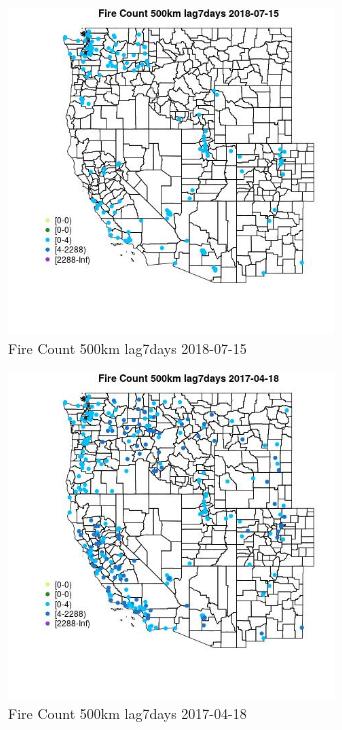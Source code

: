 \begin{figure} 
\centering  
\includegraphics[width=0.77\textwidth]{Code_Outputs/Report_ML_input_PM25_Step4_part_e_de_duplicated_aves_compiled_2019-05-20wNAs_MapObsFire_Count_500km_lag7days2018-07-15.jpg} 
\caption{\label{fig:Report_ML_input_PM25_Step4_part_e_de_duplicated_aves_compiled_2019-05-20wNAsMapObsFire_Count_500km_lag7days2018-07-15}Fire Count 500km lag7days 2018-07-15} 
\end{figure} 
 

\begin{figure} 
\centering  
\includegraphics[width=0.77\textwidth]{Code_Outputs/Report_ML_input_PM25_Step4_part_e_de_duplicated_aves_compiled_2019-05-20wNAs_MapObsFire_Count_500km_lag7days2017-04-18.jpg} 
\caption{\label{fig:Report_ML_input_PM25_Step4_part_e_de_duplicated_aves_compiled_2019-05-20wNAsMapObsFire_Count_500km_lag7days2017-04-18}Fire Count 500km lag7days 2017-04-18} 
\end{figure} 
 

